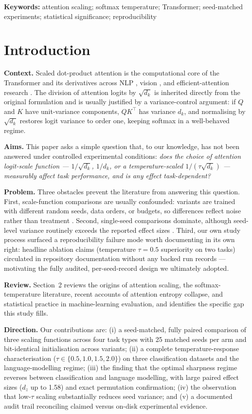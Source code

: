 \documentclass[11pt,a4paper]{article}
\begin{document}
\noindent\textbf{Keywords:} attention scaling; softmax temperature; Transformer; seed-matched experiments; statistical significance; reproducibility

\section{Introduction}

\textbf{Context.} Scaled dot-product attention is the computational core of the Transformer \cite{vaswani2017} and its derivatives across NLP \cite{devlin2019}, vision \cite{dosovitskiy2021}, and efficient-attention research \cite{dao2022,kitaev2020}. The division of attention logits by $\sqrt{d_k}$ is inherited directly from the original formulation and is usually justified by a variance-control argument: if $Q$ and $K$ have unit-variance components, $QK^{\top}$ has variance $d_k$, and normalising by $\sqrt{d_k}$ restores logit variance to order one, keeping softmax in a well-behaved regime.

\textbf{Aims.} This paper asks a simple question that, to our knowledge, has not been answered under controlled experimental conditions: \emph{does the choice of attention logit-scale function --- $1/\sqrt{d_k}$, $1/d_k$, or a temperature-scaled $1/(\tau\sqrt{d_k})$ --- measurably affect task performance, and is any effect task-dependent?}

\textbf{Problem.} Three obstacles prevent the literature from answering this question. First, scale-function comparisons are usually confounded: variants are trained with different random seeds, data orders, or budgets, so differences reflect noise rather than treatment \cite{bouthillier2021,refreimers2017}. Second, single-seed comparisons dominate, although seed-level variance routinely exceeds the reported effect sizes \cite{dodge2019,dror2018}. Third, our own study process surfaced a reproducibility failure mode worth documenting in its own right: headline ablation claims (temperature $\tau{=}0.5$ superiority on two tasks) circulated in repository documentation without any backed run records --- motivating the fully audited, per-seed-record design we ultimately adopted.

\textbf{Review.} Section~2 reviews the origins of attention scaling, the softmax-temperature literature, recent accounts of attention entropy collapse, and statistical practice in machine-learning evaluation, and identifies the specific gap this study fills.

\textbf{Direction.} Our contributions are: (i) a seed-matched, fully paired comparison of three scaling functions across four task types with 25 matched seeds per arm and bit-identical initialisation across variants; (ii) a complete temperature-response characterisation ($\tau \in \{0.5, 1.0, 1.5, 2.0\}$) on three classification datasets and the language-modelling regime; (iii) the finding that the optimal sharpness regime reverses between classification and language modelling, with large paired effect sizes ($d_z$ up to 1.58) and exact permutation confirmation; (iv) the observation that low-$\tau$ scaling substantially reduces seed variance; and (v) a documented audit trail reconciling claimed versus on-disk experimental evidence.
\end{document}
